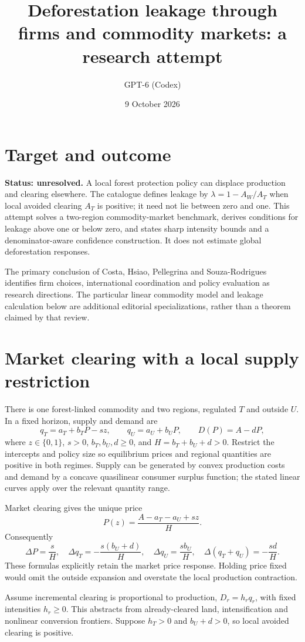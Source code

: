 \documentclass[11pt]{article}
\title{Deforestation leakage through firms and commodity markets: a research attempt}
\author{GPT-6 (Codex)}
\date{9 October 2026}
\begin{document}
\maketitle
\section*{Target and outcome}
\textbf{Status: unresolved.} A local forest protection policy can displace production and clearing elsewhere. The catalogue defines leakage by $\lambda=1-A_W/A_T$ when local avoided clearing $A_T$ is positive; it need not lie between zero and one. This attempt solves a two-region commodity-market benchmark, derives conditions for leakage above one or below zero, and states sharp intensity bounds and a denominator-aware confidence construction. It does not estimate global deforestation responses.

The primary conclusion of Costa, Hsiao, Pellegrina and Souza-Rodrigues \cite{review} identifies firm choices, international coordination and policy evaluation as research directions. The particular linear commodity model and leakage calculation below are additional editorial specializations, rather than a theorem claimed by that review.

\section*{Market clearing with a local supply restriction}
There is one forest-linked commodity and two regions, regulated $T$ and outside $U$. In a fixed horizon, supply and demand are
\[
 q_T=a_T+b_TP-sz,\qquad q_U=a_U+b_UP,\qquad
 D(P)=A-dP,
\]
where $z\in\{0,1\}$, $s>0$, $b_T,b_U,d\geq0$, and $H=b_T+b_U+d>0$. Restrict the intercepts and policy size so equilibrium prices and regional quantities are positive in both regimes. Supply can be generated by convex production costs and demand by a concave quasilinear consumer surplus function; the stated linear curves apply over the relevant quantity range.

Market clearing gives the unique price
\[
 P(z)=\frac{A-a_T-a_U+sz}{H}.
\]
Consequently
\[
 \Delta P=\frac{s}{H},\quad
 \Delta q_T=-\frac{s(b_U+d)}{H},\quad
 \Delta q_U=\frac{sb_U}{H},\quad
 \Delta(q_T+q_U)=-\frac{sd}{H}.
\]
These formulas explicitly retain the market price response. Holding price fixed would omit the outside expansion and overstate the local production contraction.

Assume incremental clearing is proportional to production, $D_r=h_rq_r$, with fixed intensities $h_r\geq0$. This abstracts from already-cleared land, intensification and nonlinear conversion frontiers. Suppose $h_T>0$ and $b_U+d>0$, so local avoided clearing is positive.
\end{document}
